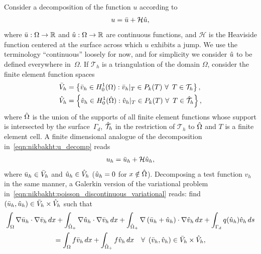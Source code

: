 Consider a decomposition of the function $u$ according to\enlargethispage{12pt}
%
\begin{equation}
  u = \Bar{u} + \mathcal{H} \Hat{u},
\label{eqn:nikbakht:u_decomp}
\end{equation}
%
where $\Bar{u}: \Omega \rightarrow \mathbb{R}$ and $\Hat{u}: \Omega
\rightarrow \mathbb{R}$ are\vadjust{\pagebreak} continuous functions, and $\mathcal{H}$ is
the Heaviside function centered at the surface across which $u$ exhibits
a jump.  We use the terminology ``continuous'' loosely for now, and for
simplicity we consider $\Hat{u}$ to be defined everywhere in~$\Omega$.
If $\mathcal{T}_h$ is a triangulation of the domain $\Omega$, consider
the finite element function spaces
%
\begin{align}
  \Bar{V}_{h} &= \left\{ {\Bar{v}_{h} \in H^{1}_{0}(\Omega)
                    : \Bar{v}_{h}|_{T} \in P_{k}(T) \ \forall\, \ T \in \mathcal{T}_h} \right\},
\\
  \Hat{V}_{h} &= \left\{ {\Hat{v}_{h} \in H^{1}_{0}(\Hat{\Omega})
                    : \Hat{v}_{h}|_{T} \in P_{k}(T) \ \forall\, \ T \in \Hat{\mathcal{T}}_h} \right\},
\end{align}
%
where $\Hat{\Omega}$ is the union of the supports of all finite element
functions whose support is intersected by the surface~$\Gamma_{d}$,
$\Hat{\mathcal{T}}_h$ in the restriction of $\mathcal{T}_h$ to $\Hat{\Omega}$
and $T$ is a finite element cell. A finite dimensional analogue of the
decomposition in~\eqref{eqn:nikbakht:u_decomp} reads
%
\begin{equation}
  u_{h} = \Bar{u}_{h} + \mathcal{H} \Hat{u}_{h},
  \label{eqn:nikbakht:u_h_decomp}
\end{equation}
%
where $\Bar{u}_{h} \in \Bar{V}_{h}$ and $\Hat{u}_{h}
\in \Hat{V}_{h}$ ($\Hat{u}_{h} = 0$ for $x \notin
\Hat{\Omega}$).  Decomposing a test function $v_{h}$ in the
same manner, a Galerkin version of the variational problem
in~\eqref{eqn:nikbakht:poisson_discontinuous_variational} reads: find
$(\Bar{u}_{h}, \Hat{u}_{h}) \in \Bar{V}_{h} \times \Hat{V}_{h}$ such that
%
\begin{multline}
     \int_{\Omega} \nabla \Bar{u}_{h} \cdot \nabla \Bar{v}_{h} \, d x
     + \int_{\Hat{\Omega}_{+}} \nabla \Hat{u}_{h} \cdot  \nabla \Bar{v}_{h} \, d x
     + \int_{\Hat{\Omega}_{+}}  \nabla \left( {\Bar{u}_{h} + \Hat{u}_{h}} \right) \cdot \nabla \Hat{v}_{h} \, d x
     + \int_{\Gamma_d} q(\Hat{u}_h)\Hat{v}_h \, d s
\\
  =
   \int_{\Omega} f \Bar{v}_{h} \, d x
 + \int_{\Hat{\Omega}_{+}}  f \Hat{v}_{h} \, d x
      \quad \forall\, \ (\Bar{v}_{h}, \Hat{v}_{h}) \in \Bar{V}_{h} \times \Hat{V}_{h},
\label{eqn:nikbakht:poisson_expanded_discontinuous_variational}
\end{multline}
